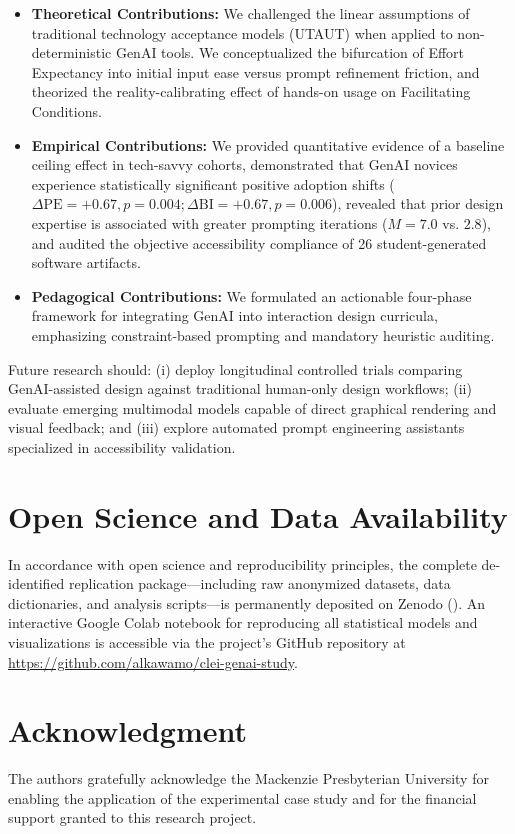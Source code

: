 \documentclass{cleiej}
\begin{document}
\begin{itemize}[leftmargin=*]
    \item \textbf{Theoretical Contributions:} We challenged the linear assumptions of traditional technology acceptance models (UTAUT) when applied to non-deterministic GenAI tools. We conceptualized the bifurcation of Effort Expectancy into initial input ease versus prompt refinement friction, and theorized the reality-calibrating effect of hands-on usage on Facilitating Conditions.
    \item \textbf{Empirical Contributions:} We provided quantitative evidence of a baseline ceiling effect in tech-savvy cohorts, demonstrated that GenAI novices experience statistically significant positive adoption shifts ($\Delta \text{PE} = +0.67, p = 0.004; \Delta \text{BI} = +0.67, p = 0.006$), revealed that prior design expertise is associated with greater prompting iterations ($M = 7.0$ vs. $2.8$), and audited the objective accessibility compliance of 26 student-generated software artifacts.
    \item \textbf{Pedagogical Contributions:} We formulated an actionable four-phase framework for integrating GenAI into interaction design curricula, emphasizing constraint-based prompting and mandatory heuristic auditing.
\end{itemize}

Future research should: (i) deploy longitudinal controlled trials comparing GenAI-assisted design against traditional human-only design workflows; (ii) evaluate emerging multimodal models capable of direct graphical rendering and visual feedback; and (iii) explore automated prompt engineering assistants specialized in accessibility validation.

\section*{Open Science and Data Availability}
In accordance with open science and reproducibility principles, the complete de-identified replication package---including raw anonymized datasets, data dictionaries, and analysis scripts---is permanently deposited on Zenodo (). An interactive Google Colab notebook for reproducing all statistical models and visualizations is accessible via the project's GitHub repository at \url{https://github.com/alkawamo/clei-genai-study}.

\section*{Acknowledgment}
The authors gratefully acknowledge the Mackenzie Presbyterian University for enabling the application of the experimental case study and for the financial support granted to this research project.
\end{document}
